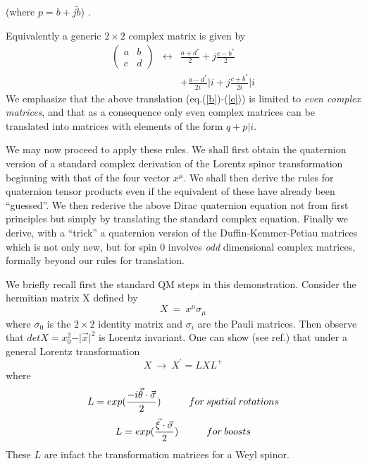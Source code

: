 \begin{center}
(where $p=b+j\tilde{b}$) .
\end{center}
Equivalently a generic $2 \times 2$ complex matrix is given by
\begin{eqnarray}
\left( \begin{array}{cc}
a & b\\
c & d\end{array} \right) & \leftrightarrow & \frac{a+d^{*}}{2} +
j\frac{c-b^{*}}{2} \nonumber \\
 & & + \frac{a-d^{*}}{2i}\vert i + j\frac{c+b^{*}}{2i}\vert i
\end{eqnarray}
We emphasize that the above translation (eq.(\ref{b})-(\ref{e})) is limited
to {\em even complex matrices}, and that as a consequence only even complex
matrices can be translated into matrices with elements of the
form $q+p\vert i$.

We may now proceed to apply these rules. We shall first obtain the
quaternion version of a standard complex derivation of the Lorentz spinor
transformation beginning with that of the four vector $x^{\mu}$. We
shall then derive the rules for quaternion tensor products even if the
equivalent of these have already been ``guessed''\cite{del2}. We then rederive
the
above Dirac quaternion equation not from first principles but simply by
translating the standard complex equation. Finally we derive, with a
``trick'' a quaternion version of the Duffin-Kemmer-Petiau matrices which is
not only new, but for spin 0 involves {\em odd} dimensional complex
matrices, formally beyond our rules for translation.

\vspace*{11mm}


We briefly recall first the standard QM steps in this demonstration. Consider
the hermitian matrix X defined by
\begin{equation}
X \: = \: x^{\mu} \sigma_{\mu}
\end{equation}
where $\sigma_{0}$ is the $2 \times 2$ identity matrix and
$\sigma_{i}$ are the Pauli matrices. Then observe that $detX = x_{0}^{2} -
\vert\vec{x}\vert^{2}$ is Lorentz invariant. One can show (see ref.\cite{wkt})
that under a general Lorentz transformation
\begin{equation}
X \: \rightarrow \: X^{\prime} = LXL^{+}
\end{equation}
where
\begin{equation} \label{f}
L = exp(\frac{-i \vec{\theta} \cdot \vec{\sigma}}{2}) \hspace*{10mm} for
\: spatial \: rotations
\end{equation}
\begin{equation} \label{g}
L = exp(\frac{\vec{\xi} \cdot \vec{\sigma}}{2}) \hspace*{10mm} for \: boosts
\end{equation}
These $L$ are infact the transformation matrices for a Weyl spinor.

